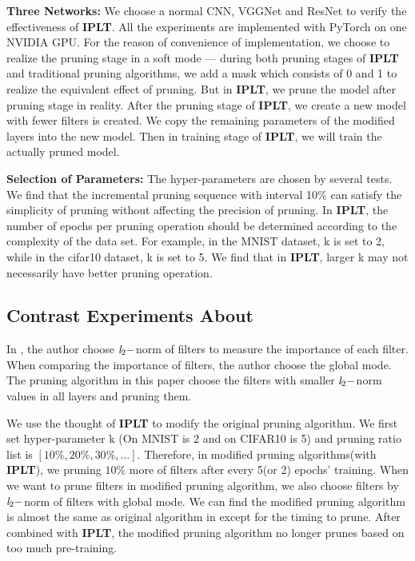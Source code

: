 \documentclass[runningheads]{llncs}
\begin{document}
\textbf{Three Networks:} We choose a normal CNN, VGGNet\cite{b2} and ResNet to verify the effectiveness of \textbf{IPLT}. All the experiments are implemented with PyTorch on one NVIDIA GPU. For the reason of convenience of implementation, we choose to realize the pruning stage in a soft mode --- during both pruning stages of \textbf{IPLT} and traditional pruning algorithms, we add a mask which consists of 0 and 1 to realize the equivalent effect of pruning. But in \textbf{IPLT}, we prune the model after pruning stage in reality. After the pruning stage of \textbf{IPLT}, we create a new model with fewer filters is created. We copy the remaining parameters of the modified layers into the new model. Then in training stage of \textbf{IPLT}, we will train the actually pruned model.

\textbf{Selection of Parameters:} The hyper-parameters are chosen by several tests. We find that the incremental pruning sequence with interval 10\% can satisfy the simplicity of pruning without affecting the precision of pruning. In \textbf{IPLT}, the number of epochs per pruning operation should be determined according to the complexity of the data set. For example, in the MNIST dataset, k is set to 2, while in the cifar10 dataset, k is set to 5. We find that in \textbf{IPLT}, larger k may not necessarily have better pruning operation.

\subsection{Contrast Experiments About \cite{b35}}
In \cite{b35}, the author choose $\emph{l}_2-$norm of filters to measure the importance of each filter. When comparing the importance of filters, the author choose the global mode. The pruning algorithm in this paper choose the filters with smaller $\emph{l}_2-$norm values in all layers and pruning them.

We use the thought of \textbf{IPLT} to modify the original pruning algorithm. We first set hyper-parameter k (On MNIST is 2 and on CIFAR10 is 5) and pruning ratio list is $[10\%, 20\%, 30\%, \dots]$. Therefore, in modified pruning algorithms(with \textbf{IPLT}), we pruning $10\%$ more of filters after every 5(or 2) epochs' training. When we want to prune filters in modified pruning algorithm, we also choose filters by $\emph{l}_2-$norm of filters with global mode.
We can find the modified pruning algorithm is almost the same as original algorithm in \cite{b35} except for the timing to prune. After combined with \textbf{IPLT}, the modified pruning algorithm no longer prunes based on too much pre-training.
\end{document}

